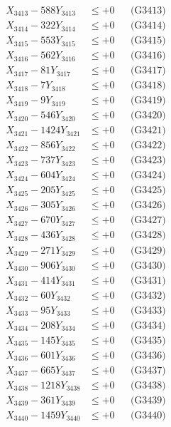 \documentclass[a4paper,10pt]{article}
\begin{document}
{\begin{align}
X_{3413} - 588Y_{3413} &\leq +0 && \text{(G3413)} \\
X_{3414} - 322Y_{3414} &\leq +0 && \text{(G3414)} \\
X_{3415} - 553Y_{3415} &\leq +0 && \text{(G3415)} \\
X_{3416} - 562Y_{3416} &\leq +0 && \text{(G3416)} \\
X_{3417} - 81Y_{3417} &\leq +0 && \text{(G3417)} \\
X_{3418} - 7Y_{3418} &\leq +0 && \text{(G3418)} \\
X_{3419} - 9Y_{3419} &\leq +0 && \text{(G3419)} \\
X_{3420} - 546Y_{3420} &\leq +0 && \text{(G3420)} \\
\allowbreak
X_{3421} - 1424Y_{3421} &\leq +0 && \text{(G3421)} \\
X_{3422} - 856Y_{3422} &\leq +0 && \text{(G3422)} \\
X_{3423} - 737Y_{3423} &\leq +0 && \text{(G3423)} \\
X_{3424} - 604Y_{3424} &\leq +0 && \text{(G3424)} \\
X_{3425} - 205Y_{3425} &\leq +0 && \text{(G3425)} \\
X_{3426} - 305Y_{3426} &\leq +0 && \text{(G3426)} \\
X_{3427} - 670Y_{3427} &\leq +0 && \text{(G3427)} \\
X_{3428} - 436Y_{3428} &\leq +0 && \text{(G3428)} \\
X_{3429} - 271Y_{3429} &\leq +0 && \text{(G3429)} \\
X_{3430} - 906Y_{3430} &\leq +0 && \text{(G3430)} \\
\allowbreak
X_{3431} - 414Y_{3431} &\leq +0 && \text{(G3431)} \\
X_{3432} - 60Y_{3432} &\leq +0 && \text{(G3432)} \\
X_{3433} - 95Y_{3433} &\leq +0 && \text{(G3433)} \\
X_{3434} - 208Y_{3434} &\leq +0 && \text{(G3434)} \\
X_{3435} - 145Y_{3435} &\leq +0 && \text{(G3435)} \\
X_{3436} - 601Y_{3436} &\leq +0 && \text{(G3436)} \\
X_{3437} - 665Y_{3437} &\leq +0 && \text{(G3437)} \\
X_{3438} - 1218Y_{3438} &\leq +0 && \text{(G3438)} \\
X_{3439} - 361Y_{3439} &\leq +0 && \text{(G3439)} \\
X_{3440} - 1459Y_{3440} &\leq +0 && \text{(G3440)} \\

\end{align}}
\end{document}
